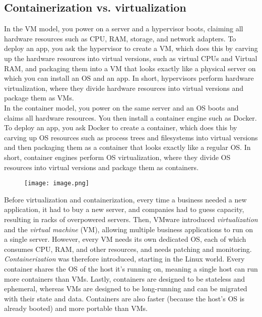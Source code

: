\documentclass[8pt, table, xcdraw]{article}%
\begin{document}
\subsection{Containerization vs. virtualization}

In the VM model, you power on a server and a hypervisor boots, claiming all hardware resources such as CPU, RAM, storage, and network adapters. To deploy an app, you ask the hypervisor to create a VM, which does this by carving up the hardware resources into virtual versions, such as virtual CPUs and Virtual RAM, and packaging them into a VM that looks exactly like a physical server on which you can install an OS and an app. In short, hypervisors perform hardware virtualization, where they divide hardware resources into virtual versions and package them as VMs.\\
In the container model, you power on the same server and an OS boots and claims all hardware resources. You then install a container engine such as Docker. To deploy an app, you ask Docker to create a container, which does this by carving up OS resources such as process trees and filesystems into virtual versions and then packaging them as a container that looks exactly like a regular OS. In short, container engines perform OS virtualization, where they divide OS resources into virtual versions and package them as containers.

\begin{figure}[h]
    \centering
    \texttt{[image: image.png]}
\end{figure}

Before virtualization and containerization, every time a business needed a new application, it had to buy a new server, and companies had to guess capacity, resulting in racks of overpowered servers. Then, VMware introduced \emph{virtualization} and the \emph{virtual machine} (VM), allowing multiple business applications to run on a single server. However, every VM needs its own dedicated OS, each of which consumes CPU, RAM, and other resources, and needs patching and monitoring. \emph{Containerization} was therefore introduced, starting in the Linux world. Every container shares the OS of the host it’s running on, meaning a single host can run more containers than VMs. Lastly, containers are designed to be stateless and ephemeral, whereas VMs are designed to be long-running and can be migrated with their state and data. Containers are also faster (because the host’s OS is already booted) and more portable than VMs.
\end{document}
